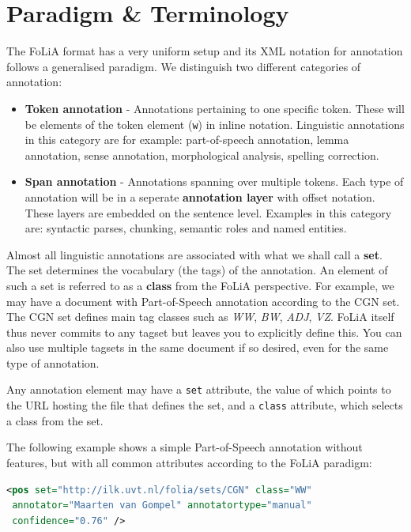\documentclass[a4paper,12pt]{report}
\begin{document}
    

\section{Paradigm \& Terminology}
\label{sec:paradigm}

The FoLiA format has a very uniform setup and its XML notation for annotation follows a generalised paradigm. We distinguish two different categories of annotation:

\begin{itemize}
\item \textbf{Token annotation} - Annotations pertaining to one specific token. These will be elements of the token element (\texttt{w}) in inline notation. Linguistic annotations in this category are for example: part-of-speech annotation, lemma annotation, sense annotation, morphological analysis, spelling correction. 
\item \textbf{Span annotation} - Annotations spanning over multiple tokens. Each type of annotation will be in a seperate \textbf{annotation layer} with offset notation. These layers are embedded on the sentence level. Examples in this category are: syntactic parses, chunking, semantic roles and named entities.
\end{itemize}

Almost all linguistic annotations are associated with what we shall call a \textbf{set}. The set determines the vocabulary (the tags) of the annotation. An element of such a set is referred to as a \textbf{class} from the FoLiA perspective. For example, we may have a document with Part-of-Speech annotation according to the CGN set. The CGN set defines main tag classes such as \emph{WW}, \emph{BW}, \emph{ADJ}, \emph{VZ}. FoLiA itself thus never commits to any tagset but leaves you to explicitly define this. You can also use multiple tagsets in the same document if so desired, even for the same type of annotation.

Any annotation element may have a \texttt{set} attribute, the value of which points to the URL hosting the file that defines the set, and a \texttt{class} attribute, which selects a class from the set.

The following example shows a simple Part-of-Speech annotation without features, but with all common attributes according to the FoLiA paradigm:

\begin{lstlisting}[language=xml]
<pos set="http://ilk.uvt.nl/folia/sets/CGN" class="WW" 
 annotator="Maarten van Gompel" annotatortype="manual"
 confidence="0.76" />
\end{lstlisting}
\end{document}
